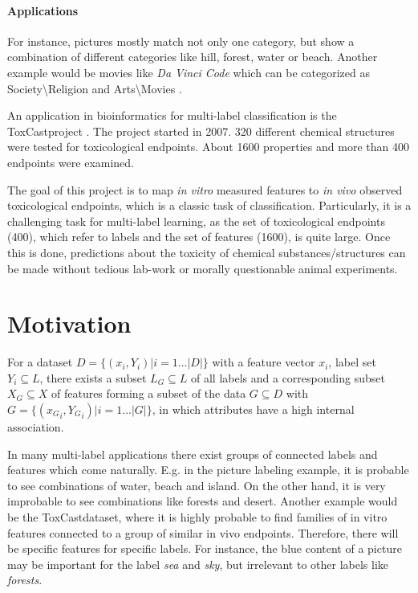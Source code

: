 			\paragraph{Applications}
				For instance, pictures mostly match not only one category, but show a combination of different categories like hill, forest, water or beach. Another example would be movies like \textit{Da Vinci Code} which can be categorized as Society\textbackslash Religion and Arts\textbackslash Movies \cite{Tsoumakas07}.

				An application in bioinformatics for multi-label classification is the ToxCast\tm project \cite{Dix07}. The project started in 2007. 320 different chemical structures were tested for toxicological endpoints. About 1600 properties and more than 400 endpoints were examined.

				The goal of this project is to map \textit{in vitro} measured features to \textit{in vivo} observed toxicological endpoints, which is a classic task of classification. Particularly, it is a challenging task for multi-label learning, as the set of toxicological endpoints (400), which refer to labels and the set of features (1600), is quite large. Once this is done, predictions about the toxicity of chemical substances/structures can be made without tedious lab-work or morally questionable animal experiments.

	\section{Motivation}
		\begin{task}
			For a dataset \mbox{$ D= \{(x_i,Y_i) | i=1...|D|\} $} with a feature vector $ x_i $, label set \mbox{$ Y_i \subseteq L$}, there exists a subset \mbox{$ L_G \subseteq L $} of all labels and a corresponding subset \mbox{$ X_G \subseteq X $} of features forming a subset of the data \mbox{$ G \subseteq D $} with \mbox{$ G = \{({x_G}_i,{Y_G}_i) | i=1...|G|\} $}, in which attributes have a high internal association.
		\label{theorem}
		\end{task}

		In many multi-label applications there exist groups of connected labels and features which come naturally. E.g. in the picture labeling example, it is probable to see combinations of water, beach and island. On the other hand, it is very improbable to see combinations like forests and desert. Another example would be the ToxCast\tm dataset, where it is highly probable to find families of in vitro features connected to a group of similar in vivo endpoints. Therefore, there will be specific features for specific labels. For instance, the blue content of a picture may be important for the label \textit{sea} and \textit{sky}, but irrelevant to other labels like \textit{forests}.

